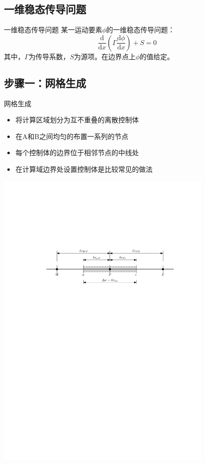 \subsection{一维稳态传导问题}
\begin{frame}{一维稳态传导问题}
某一运动要素$\phi$的一维稳态传导问题：
\begin{equation*}
  \frac{\mathrm{d}}{\mathrm{d} x}(\Gamma \frac{\mathrm{d} \phi}{\mathrm{d} x}) +
  S = 0
\end{equation*}
其中，$\Gamma$为传导系数，$S$为源项。在边界点上$\phi$的值给定。
\end{frame}

\subsection{步骤一：网格生成}
\begin{frame}{网格生成}
  \begin{itemize}
    \item 将计算区域划分为互不重叠的离散控制体
    \item 在A和B之间均匀的布置一系列的节点
    \item 每个控制体的边界位于相邻节点的中线处
    \item 在计算域边界处设置控制体是比较常见的做法
  \end{itemize}
  \vspace{1cm}
\begin{center}
  \includegraphics[width=0.8\textwidth]{FVmGridNotation.pdf}
\end{center}
\end{frame}

